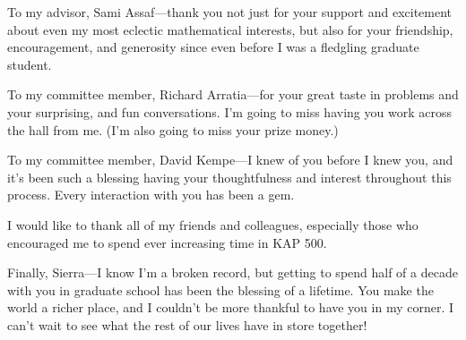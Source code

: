 To my advisor, Sami Assaf---thank you not just for your support and
excitement about even my most eclectic mathematical interests,
but also for your friendship, encouragement, and generosity
since even before I was a fledgling graduate student.

To my committee member, Richard Arratia---for your great taste
in problems and your surprising, and fun conversations. I'm going to miss having
you work across the hall from me. (I'm also going to miss your prize money.)

To my committee member, David Kempe---I knew of you before I knew you, and it's been
such a blessing having your thoughtfulness and interest throughout this process.
Every interaction with you has been a gem.

I would like to thank all of my friends and colleagues,
especially those who encouraged me to spend ever increasing time in KAP 500.

Finally, Sierra---I know I'm a broken record, but getting to spend half of a
decade with you in graduate school has been the blessing of a lifetime.
You make the world a richer place, and I couldn't be more thankful to have you
in my corner.
I can't wait to see what the rest of our lives have in store together!
